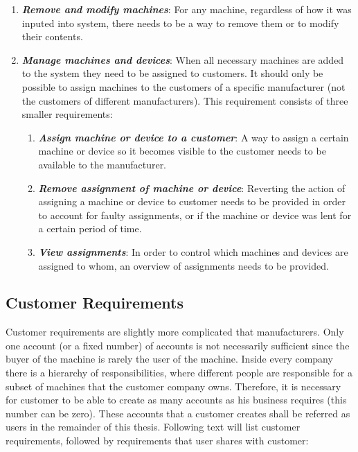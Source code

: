 \begin{enumerate}
	\item \textbf{\textit{Remove and modify machines}}: For any machine, regardless of how it was inputed into system, there needs to be a way to remove them or to modify their contents.

	\item \textbf{\textit{Manage machines and devices}}: When all necessary machines are added to the system they need to be assigned to customers. It should only be possible to assign machines to the customers of a specific manufacturer (not the customers of different manufacturers). This requirement consists of three smaller requirements:
		\begin{enumerate}
			\item \textbf{\textit{Assign machine or device to a customer}}: A way to assign a certain machine or device so it becomes visible to the customer needs to be available to the manufacturer.
			\item \textbf{\textit{Remove assignment of machine or device}}: Reverting the action of assigning a machine or device to customer needs to be provided in order to account for faulty assignments, or if the machine or device was lent for a certain period of time.
			\item \textbf{\textit{View assignments}}: In order to control which machines and devices are assigned to whom, an overview of assignments needs to be provided.
		\end{enumerate}
\end{enumerate}

\subsection{Customer Requirements}

Customer requirements are slightly more complicated that manufacturers. Only one account (or a fixed number) of accounts is not necessarily sufficient since the buyer of the machine is rarely the user of the machine. Inside every company there is a hierarchy of responsibilities, where different people are responsible for a subset of machines that the customer company owns. Therefore, it is necessary for customer to be able to create as many accounts as his business requires (this number can be zero). These accounts that a customer creates shall be referred as users in the remainder of this thesis. Following text will list customer requirements, followed by requirements that user shares with customer:

